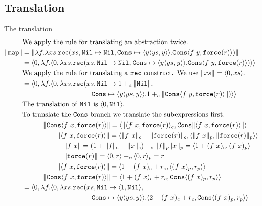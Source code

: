 \subsection{Translation}
The translation
\begin{align*}
  &\text{We apply the rule for translating an abstraction twice.}\\
  \|\texttt{map}\| &= \|\lambda f. \lambda xs . \texttt{rec}(xs, \texttt{Nil} \mapsto \texttt{Nil}, \texttt{Cons} \mapsto \langle y \langle ys, y \rangle\rangle. \texttt{Cons}\langle f\ y, \texttt{force}(r)\rangle)\| \\
              &= \langle 0, \lambda f. \langle 0, \lambda xs . \texttt{rec}(xs, \texttt{Nil} \mapsto \texttt{Nil}, \texttt{Cons} \mapsto \langle y \langle ys, y \rangle\rangle. \texttt{Cons}\langle f\ y, \texttt{force}(r)\rangle)\rangle\rangle \\
              &\text{We apply the rule for translating a \texttt{rec} construct. We use $\|xs\| = \langle 0,xs\rangle$.}\\
              &= \langle 0, \lambda f. \langle 0, \lambda xs .\texttt{rec}(xs, \texttt{Nil} \mapsto 1 +_c \|\texttt{Nil}\|, \\
              &\qquad\quad\quad\quad\qquad\quad\quad\quad \texttt{Cons} \mapsto \langle y \langle ys, y \rangle\rangle.1 +_c \|\texttt{Cons}\langle f\ y, \texttt{force}(r)\rangle\|)\rangle\rangle \\
              &\text{The translation of \texttt{Nil} is $\langle 0, \texttt{Nil}\rangle$.}\\
              &\text{To translate the \texttt{Cons} branch we translate the subexpressions first.}\\
              &\qquad\quad\|\texttt{Cons}\langle f\ x,\texttt{force}(r)\rangle\| = \langle \|\langle f\ x,\texttt{force}(r)\rangle_c, \texttt{Cons}\|\langle f\ x,\texttt{force}(r)\rangle\|\rangle \\
              &\qquad\quad\quad\quad \|\langle f\ x,\texttt{force}(r)\rangle\| = \langle\|f\ x\|_c + \|\texttt{force}(r)\|_c, \langle \|f\ x\|_p,\|\texttt{force}(r)\|_p\rangle\rangle \\
              &\qquad\quad\quad\quad\quad \|f\ x\| = (1 + \|f\|_c + \|x\|_c) +_c \|f\|_p\|x\|_p = \langle 1 + (f\ x)_c, (f\ x)_p\rangle \\
              &\qquad\quad\quad\quad\quad \|\texttt{force}(r)\| = \langle 0,r\rangle +_c \langle 0,r\rangle_p = r \\
              &\qquad\quad\quad\quad \|\langle f\ x,\texttt{force}(r)\rangle\| = \langle 1 + (f\ x)_c + r_c, \langle (f\ x)_p,r_p\rangle\rangle \\
              &\qquad\quad \|\texttt{Cons}\langle f\ x,\texttt{force}(r)\rangle\| = \langle 1 + (f\ x)_c + r_c, \texttt{Cons}\langle (f\ x)_p,r_p\rangle\rangle \\
              &= \langle 0, \lambda f. \langle 0, \lambda xs . \texttt{rec}(xs, \texttt{Nil} \mapsto \langle 1,\texttt{Nil}\rangle, \\
              &\qquad\quad\quad\quad\qquad\quad\quad\quad \texttt{Cons} \mapsto \langle y \langle ys, y \rangle\rangle.\langle 2 + (f\ x)_c + r_c, \texttt{Cons}\langle (f\ x)_p,r_p\rangle\rangle \\
\end{align*}
